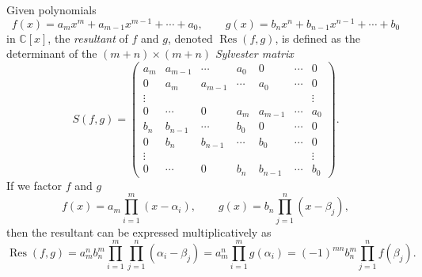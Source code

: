 \documentclass[table]{amsart}
\numberwithin{equation}{section}
\begin{document}
\par Given polynomials
\[
f(x) = a_m x^m + a_{m-1}x^{m-1} + \cdots + a_0, \qquad 
g(x) = b_n x^n + b_{n-1}x^{n-1} + \cdots + b_0
\]
in \(\mathbb{C}[x]\), the \emph{resultant} of \(f\) and \(g\), denoted \(\operatorname{Res}(f,g)\), is defined as the determinant of the \((m+n)\times(m+n)\) \emph{Sylvester matrix}
\[
S(f,g) =
\begin{pmatrix}
a_m & a_{m-1} & \cdots & a_0 & 0 & \cdots & 0 \\
0 & a_m & a_{m-1} & \cdots & a_0 & \cdots & 0 \\
\vdots &  &  &  &  &  & \vdots \\
0 & \cdots & 0 & a_m & a_{m-1} & \cdots & a_0 \\[4pt]
b_n & b_{n-1} & \cdots & b_0 & 0 & \cdots & 0 \\
0 & b_n & b_{n-1} & \cdots & b_0 & \cdots & 0 \\
\vdots &  &  &  &  &  & \vdots \\
0 & \cdots & 0 & b_n & b_{n-1} & \cdots & b_0
\end{pmatrix}.
\]
\noindent If we factor \(f\) and \(g\)
\[
f(x)=a_m\prod_{i=1}^m (x-\alpha_i), \qquad
g(x)=b_n\prod_{j=1}^n (x-\beta_j),
\]
then the resultant can be expressed multiplicatively as
\begin{equation}\label{basicresultantproperty}\operatorname{Res}(f,g)
= a_m^n b_n^m \prod_{i=1}^m \prod_{j=1}^n (\alpha_i - \beta_j)=a_m^n \prod_{i=1}^m g(\alpha_i)
= (-1)^{mn} b_n^m \prod_{j=1}^n f(\beta_j).
\end{equation}
\end{document}

